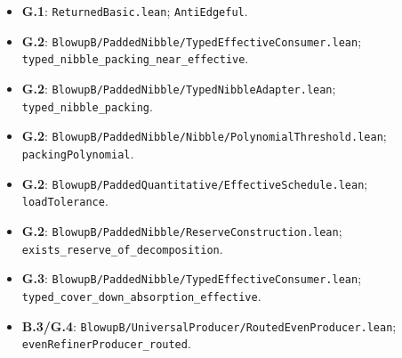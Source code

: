 \documentclass[spanish,11pt,a4paper]{article}
\providecommand{\tightlist}{\setlength{\itemsep}{0pt}\setlength{\parskip}{0pt}}
\begin{document}
\begin{itemize}
\tightlist
\item
  \textbf{G.1}: \texttt{Returned\allowbreak{}Basi\allowbreak{}c.\allowbreak{}lean}; \texttt{Anti\allowbreak{}Edgeful}.
\item
  \textbf{G.2}: \texttt{Blowup\allowbreak{}B/\allowbreak{}Padd\allowbreak{}ed\allowbreak{}Nibble/\allowbreak{}Typ\allowbreak{}ed\allowbreak{}Effective\allowbreak{}C\allowbreak{}onsumer.\allowbreak{}lean\allowbreak{}}; \texttt{typed\_\allowbreak{}nibble\allowbreak{}\_\allowbreak{}packing\_\allowbreak{}nea\allowbreak{}r\_\allowbreak{}effective}.
\item
  \textbf{G.2}: \texttt{Blowup\allowbreak{}B/\allowbreak{}Padd\allowbreak{}ed\allowbreak{}Nibble/\allowbreak{}Typ\allowbreak{}ed\allowbreak{}Nibble\allowbreak{}Adap\allowbreak{}ter.\allowbreak{}lean}; \texttt{typed\_\allowbreak{}nibble\allowbreak{}\_\allowbreak{}packing}.
\item
  \textbf{G.2}: \texttt{Blowup\allowbreak{}B/\allowbreak{}Padd\allowbreak{}ed\allowbreak{}Nibble/\allowbreak{}Nib\allowbreak{}ble/\allowbreak{}Polynomi\allowbreak{}al\allowbreak{}Threshold.\allowbreak{}\allowbreak{}lean}; \texttt{packing\allowbreak{}Polyn\allowbreak{}omial}.
\item
  \textbf{G.2}: \texttt{Blowup\allowbreak{}B/\allowbreak{}Padd\allowbreak{}ed\allowbreak{}Quantitati\allowbreak{}ve/\allowbreak{}Effective\allowbreak{}\allowbreak{}Schedule.\allowbreak{}lea\allowbreak{}n}; \texttt{load\allowbreak{}Toleranc\allowbreak{}e}.
\item
  \textbf{G.2}: \texttt{Blowup\allowbreak{}B/\allowbreak{}Padd\allowbreak{}ed\allowbreak{}Nibble/\allowbreak{}Res\allowbreak{}erve\allowbreak{}Construc\allowbreak{}tion.\allowbreak{}lean}; \texttt{exists\_\allowbreak{}reser\allowbreak{}ve\_\allowbreak{}of\_\allowbreak{}decomp\allowbreak{}osition}.
\item
  \textbf{G.3}: \texttt{Blowup\allowbreak{}B/\allowbreak{}Padd\allowbreak{}ed\allowbreak{}Nibble/\allowbreak{}Typ\allowbreak{}ed\allowbreak{}Effective\allowbreak{}C\allowbreak{}onsumer.\allowbreak{}lean\allowbreak{}}; \texttt{typed\_\allowbreak{}cover\_\allowbreak{}\allowbreak{}down\_\allowbreak{}absorpt\allowbreak{}ion\_\allowbreak{}effectiv\allowbreak{}e}.
\item
  \textbf{B.3/G.4}: \texttt{Blowup\allowbreak{}B/\allowbreak{}Univ\allowbreak{}ersal\allowbreak{}Produce\allowbreak{}r/\allowbreak{}Routed\allowbreak{}Even\allowbreak{}\allowbreak{}Producer.\allowbreak{}lea\allowbreak{}n}; \texttt{even\allowbreak{}Refiner\allowbreak{}P\allowbreak{}roducer\_\allowbreak{}rout\allowbreak{}ed}.

\end{itemize}
\end{document}
